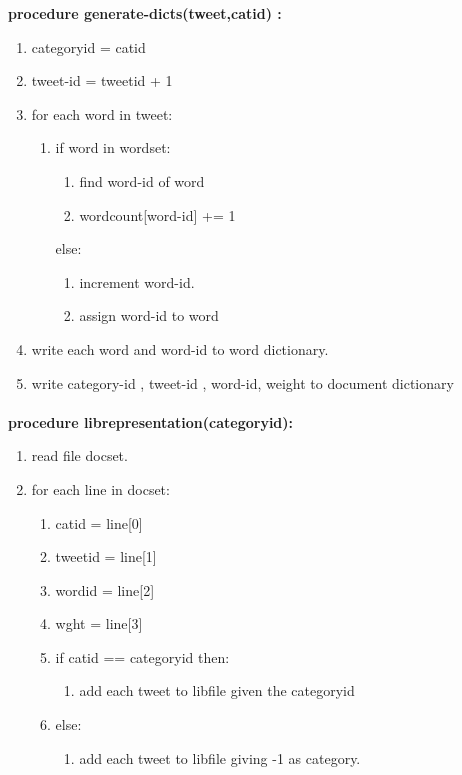 \textbf{procedure generate-dicts(tweet,catid) : }
\begin{enumerate}
  \item  categoryid = catid
  \item tweet-id = tweetid + 1
  \item for each word in tweet:
  \begin{enumerate}
      \item if word in wordset:
       \begin{enumerate}
           \item find word-id of word
           \item wordcount[word-id] += 1
           
       \end{enumerate}
       else:
        \begin{enumerate}
            \item increment word-id.
            \item assign word-id to word
        \end{enumerate}
        
  \end{enumerate}
  \item write each word and word-id to word dictionary.
  \item write category-id , tweet-id , word-id, weight to document dictionary
\end{enumerate}

\paragraph{}
\paragraph{}
\textbf{procedure librepresentation(categoryid):}
\begin{enumerate}
    \item read file docset.
    \item for each line in docset:
    \begin{enumerate}
        \item catid = line[0]
        \item tweetid = line[1]
        \item wordid = line[2]
        \item wght =  line[3]
        \item if catid == categoryid then:
        \begin{enumerate}
            \item add each tweet to libfile given the categoryid
        \end{enumerate}
        \item else:
        \begin{enumerate}
            \item add each tweet to libfile giving -1 as category. 
        \end{enumerate}
    \end{enumerate}
\end{enumerate}

